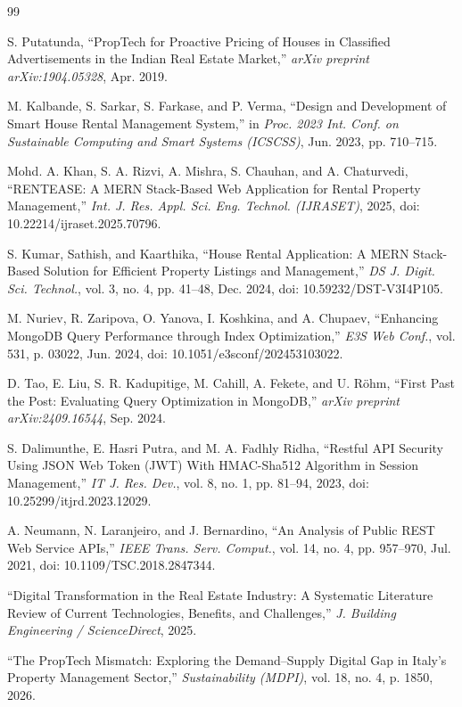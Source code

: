 \documentclass[10pt,twocolumn]{article}
\begin{document}
\balance
\begin{thebibliography}{99}\small

 S. Putatunda, ``PropTech for Proactive Pricing of Houses in Classified Advertisements in the Indian Real Estate Market,'' \emph{arXiv preprint arXiv:1904.05328}, Apr. 2019.

 M. Kalbande, S. Sarkar, S. Farkase, and P. Verma, ``Design and Development of Smart House Rental Management System,'' in \emph{Proc. 2023 Int. Conf. on Sustainable Computing and Smart Systems (ICSCSS)}, Jun. 2023, pp. 710--715.

 Mohd. A. Khan, S. A. Rizvi, A. Mishra, S. Chauhan, and A. Chaturvedi, ``RENTEASE: A MERN Stack-Based Web Application for Rental Property Management,'' \emph{Int. J. Res. Appl. Sci. Eng. Technol. (IJRASET)}, 2025, doi: 10.22214/ijraset.2025.70796.

 S. Kumar, Sathish, and Kaarthika, ``House Rental Application: A MERN Stack-Based Solution for Efficient Property Listings and Management,'' \emph{DS J. Digit. Sci. Technol.}, vol. 3, no. 4, pp. 41--48, Dec. 2024, doi: 10.59232/DST-V3I4P105.

 M. Nuriev, R. Zaripova, O. Yanova, I. Koshkina, and A. Chupaev, ``Enhancing MongoDB Query Performance through Index Optimization,'' \emph{E3S Web Conf.}, vol. 531, p. 03022, Jun. 2024, doi: 10.1051/e3sconf/202453103022.

 D. Tao, E. Liu, S. R. Kadupitige, M. Cahill, A. Fekete, and U. R\"ohm, ``First Past the Post: Evaluating Query Optimization in MongoDB,'' \emph{arXiv preprint arXiv:2409.16544}, Sep. 2024.

 S. Dalimunthe, E. Hasri Putra, and M. A. Fadhly Ridha, ``Restful API Security Using JSON Web Token (JWT) With HMAC-Sha512 Algorithm in Session Management,'' \emph{IT J. Res. Dev.}, vol. 8, no. 1, pp. 81--94, 2023, doi: 10.25299/itjrd.2023.12029.

 A. Neumann, N. Laranjeiro, and J. Bernardino, ``An Analysis of Public REST Web Service APIs,'' \emph{IEEE Trans. Serv. Comput.}, vol. 14, no. 4, pp. 957--970, Jul. 2021, doi: 10.1109/TSC.2018.2847344.

 ``Digital Transformation in the Real Estate Industry: A Systematic Literature Review of Current Technologies, Benefits, and Challenges,'' \emph{J. Building Engineering / ScienceDirect}, 2025.

 ``The PropTech Mismatch: Exploring the Demand--Supply Digital Gap in Italy's Property Management Sector,'' \emph{Sustainability (MDPI)}, vol. 18, no. 4, p. 1850, 2026.

\end{thebibliography}
\end{document}
